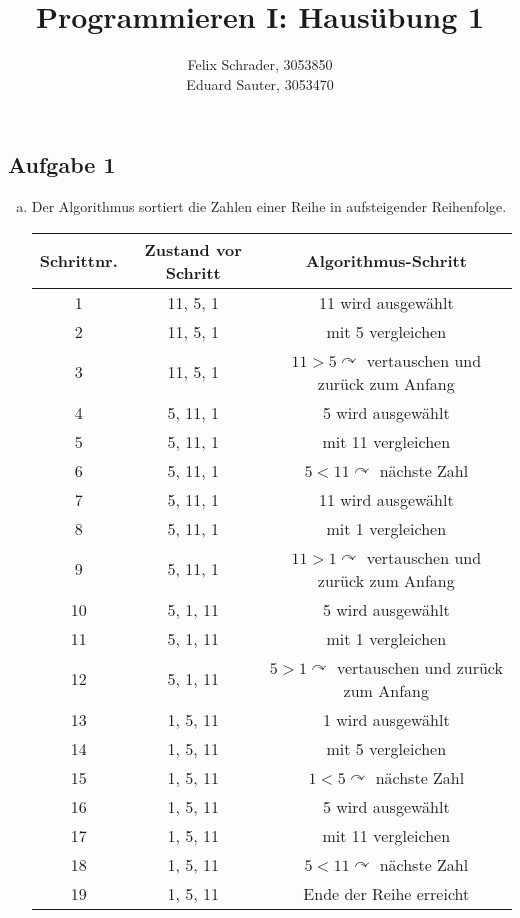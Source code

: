 \documentclass[11pt]{article}
\author{Felix Schrader, 3053850 \\
Eduard Sauter, 3053470 }
\title{Programmieren I: Haus\"ubung 1}
\begin{document}
\maketitle

\subsection*{Aufgabe 1}
\begin{enumerate}[a)]

  \item Der Algorithmus sortiert die Zahlen einer Reihe in aufsteigender
    Reihenfolge.

    \begin{table}[h!]
      \centering
      \begin{tabular}{|c|c|c|}
        \hline 
        Schrittnr. & Zustand vor Schritt & Algorithmus-Schritt \\ 
        \hline 
        1 & 11, 5, 1 & 11 wird ausgew\"ahlt \\ 
        \hline 
        2 & 11, 5, 1 & mit 5 vergleichen \\ 
        \hline 
        3 & 11, 5, 1 & $11>5\curvearrowright$ vertauschen und zur\"uck zum Anfang \\ 
        \hline 
        4 & 5, 11, 1 & 5 wird ausgew\"ahlt \\ 
        \hline 
        5 & 5, 11, 1 & mit 11 vergleichen \\ 
        \hline 
        6 & 5, 11, 1 & $5<11\curvearrowright$ n\"achste Zahl \\ 
        \hline 
        7 & 5, 11, 1 & 11 wird ausgew\"ahlt \\ 
        \hline 
        8 & 5, 11, 1 & mit 1 vergleichen \\ 
        \hline 
        9 & 5, 11, 1 & $11>1\curvearrowright$ vertauschen und zur\"uck zum Anfang \\ 
        \hline 
        10 & 5, 1, 11 & 5 wird ausgew\"ahlt \\ 
        \hline 
        11 & 5, 1, 11 & mit 1 vergleichen \\ 
        \hline 
        12 & 5, 1, 11 & $5>1\curvearrowright$ vertauschen und zur\"uck zum Anfang \\ 
        \hline 
        13 & 1, 5, 11 & 1 wird ausgew\"ahlt \\ 
        \hline 
        14 & 1, 5, 11 & mit 5 vergleichen \\ 
        \hline 
        15 & 1, 5, 11 & $1<5\curvearrowright$ n\"achste Zahl \\ 
        \hline 
        16 & 1, 5, 11 & 5 wird ausgew\"ahlt \\ 
        \hline 
        17 & 1, 5, 11 & mit 11 vergleichen \\ 
        \hline 
        18 & 1, 5, 11 & $5<11\curvearrowright$ n\"achste Zahl \\ 
        \hline 
        19 & 1, 5, 11 & Ende der Reihe erreicht \\ 
        \hline 
      \end{tabular} 
    \end{table}



\end{enumerate}
\end{document}
